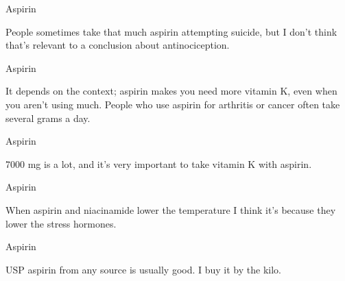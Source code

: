 \documentclass[11pt,oneside,openany,extrafontsizes]{memoir}
\begin{document}
\begin{standalonequote}{Aspirin}

    \begin{answer}
        People sometimes take that much aspirin attempting suicide, but I don't think that's relevant to a conclusion about antinociception.
    \end{answer}
\end{standalonequote}

\begin{standalonequote}{Aspirin}

    \begin{answer}
        It depends on the context; aspirin makes you need more vitamin K, even when you aren't using much. People who use aspirin for arthritis or cancer often take several grams a day.
    \end{answer}
\end{standalonequote}

\begin{standalonequote}{Aspirin}

    \begin{answer}
        7000 mg is a lot, and it's very important to take vitamin K with aspirin.
    \end{answer}
\end{standalonequote}

\begin{standalonequote}{Aspirin}

    \begin{answer}
        When aspirin and niacinamide lower the temperature I think it's because they lower the stress hormones.
    \end{answer}
\end{standalonequote}

\begin{standalonequote}{Aspirin}

    \begin{answer}
        USP aspirin from any source is usually good. I buy it by the kilo.
    \end{answer}
\end{standalonequote}
\end{document}
